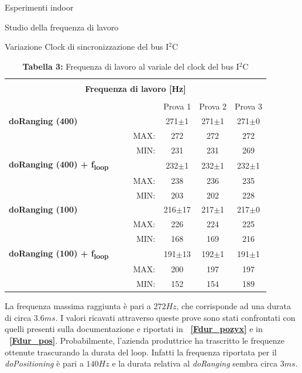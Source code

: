 \documentclass[12pt]{report}
\begin{document}
\begin{section}{Esperimenti indoor}
\begin{subsection}{Studio della frequenza di lavoro}
\begin{subsubsection}{Variazione Clock di sincronizzazione del bus I$^2$C}
			\begin{table}[H]
				\centering
				\begin{tabular}{|lcc|r|c|c|c|}
					\hline
					\multicolumn{7}{|c|}{}\\
					\multicolumn{7}{|c|}{\textbf{\Large Frequenza di lavoro [Hz]}}\\
					\multicolumn{7}{|c|}{}\\
					\hline
					\multicolumn{4}{|l|}{}&																							Prova 1&					Prova 2&					Prova 3\\
					\hline
					{\textbf{doRanging (400)}}&	 \multicolumn{3}{l|}{}&												271$\pm$1&				271$\pm$1&				271$\pm$0\\
					\hline
					 &	 & &							 MAX:&																					272&							272&							272\\
					\hline
					 &	 & &							 MIN:&																					231&							231&							269\\
					\hline
					{\textbf{doRanging (400) + f\textsubscript{loop}}}&	 	\multicolumn{3}{l|}{}&			232$\pm$1&				232$\pm$1&				232$\pm$1\\
					\hline
					 &	 & &							 MAX:&																					238&							236&							235\\
					\hline
					 &	 & &							 MIN:&																					203&							202&							228\\
					\hline
					{\textbf{doRanging (100)}}&	 \multicolumn{3}{l|}{}&												216$\pm$17&			217$\pm$1&				217$\pm$0\\
					\hline
					 &	 & &							 MAX:&																					226&							224&							225\\
					\hline
					 &	 & &							 MIN:&																					168&							169&							216\\	
					\hline
					{\textbf{doRanging (100) + f\textsubscript{loop}}}&	 	\multicolumn{3}{l|}{}&			191$\pm$13&			192$\pm$1&				191$\pm$1\\
					\hline
					 &	 & &							 MAX:&																					200&							197&							197\\
					\hline
					 &	 & &							 MIN:&																					152&							154&							189\\
					\hline
				\end{tabular}
				\caption{\textbf{Tabella 3: } Frequenza di lavoro al variale del clock del bus I$^2$C\label{Tfreqrang}}
			\end{table}	
			La frequenza massima raggiunta è pari a $272 Hz$, che corrisponde ad una durata di circa $3.6 ms$.
			I valori ricavati attraverso queste prove sono stati confrontati con quelli presenti sulla documentazione e riportati in \textbf{\figurename~\ref{Fdur_pozyx}} e in \textbf{\figurename~\ref{Fdur_pos}}. Probabilmente, l’azienda produttrice ha trascritto le frequenze ottenute trascurando la durata del loop. Infatti la 			frequenza riportata per il \textit{doPositioning} è pari a $140 Hz$  e la durata relativa al \textit{doRanging} sembra circa $3ms$. 	
			

\end{subsubsection}
\end{subsection}
\end{section}
\end{document}
